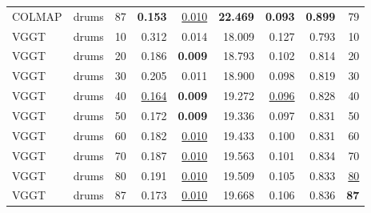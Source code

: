 \begin{table}[H]
\begin{tabular}{llrrrrrrr}
COLMAP & drums & 87 & \textbf{0.153} & \underline{0.010} & \textbf{22.469} & \textbf{0.093} & \textbf{0.899} & 79 \\
VGGT & drums & 10 & 0.312 & 0.014 & 18.009 & 0.127 & 0.793 & 10 \\
VGGT & drums & 20 & 0.186 & \textbf{0.009} & 18.793 & 0.102 & 0.814 & 20 \\
VGGT & drums & 30 & 0.205 & 0.011 & 18.900 & 0.098 & 0.819 & 30 \\
VGGT & drums & 40 & \underline{0.164} & \textbf{0.009} & 19.272 & \underline{0.096} & 0.828 & 40 \\
VGGT & drums & 50 & 0.172 & \textbf{0.009} & 19.336 & 0.097 & 0.831 & 50 \\
VGGT & drums & 60 & 0.182 & \underline{0.010} & 19.433 & 0.100 & 0.831 & 60 \\
VGGT & drums & 70 & 0.187 & \underline{0.010} & 19.563 & 0.101 & 0.834 & 70 \\
VGGT & drums & 80 & 0.191 & \underline{0.010} & 19.509 & 0.105 & 0.833 & \underline{80} \\
VGGT & drums & 87 & 0.173 & \underline{0.010} & 19.668 & 0.106 & 0.836 & \textbf{87} \\
\bottomrule
\end{tabular}
\end{table}